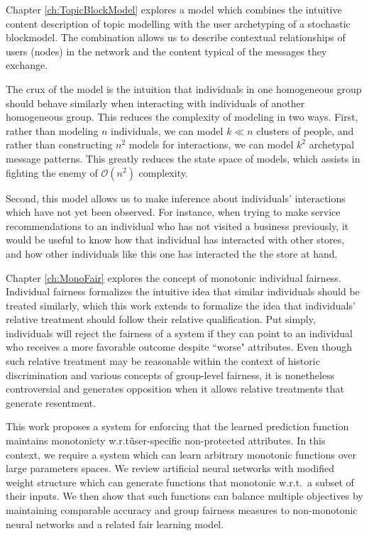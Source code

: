 Chapter \ref{ch:TopicBlockModel} explores a model which combines the intuitive content description of topic modelling with the user archetyping of a stochastic blockmodel.  The combination allows us to describe contextual relationships of users (nodes) in the network and the content typical of the messages they exchange.

The crux of the model is the intuition that individuals in one homogeneous group should behave similarly when interacting with individuals of another homogeneous group.  This reduces the complexity of modeling in two ways.  First, rather than modeling $n$ individuals, we can model $k \ll n$ clusters of people, and rather than constructing $n^2$ models for interactions, we can model $k^2$ archetypal message patterns.  This greatly reduces the state space of models, which assists in fighting the enemy of $\mathcal{O}(n^2)$ complexity.  

Second, this model allows us to make inference about individuals' interactions which have not yet been observed.  For instance, when trying to make service recommendations to an individual who has not visited a business previously, it would be useful to know how that individual has interacted with other stores, and how other individuals like this one has interacted the the store at hand.



Chapter \ref{ch:MonoFair} explores the concept of monotonic individual fairness.  Individual fairness \citep{dwork2012fairness} formalizes the intuitive idea that similar individuals should be treated similarly, which this work extends to formalize the idea that individuals' relative treatment should follow their relative qualification.  Put simply, individuals will reject the fairness of a system if they can point to an individual who receives a more favorable outcome despite ``worse" attributes.  Even though such relative treatment may be reasonable within the context of historic discrimination and various concepts of group-level fairness, it is nonetheless controversial and generates opposition when it allows relative treatments that generate resentment.

This work proposes a system for enforcing that the learned prediction function maintains monotonicty w.r.t\~ user-specific non-protected attributes.  In this context, we require a system which can learn arbitrary monotonic functions over large parameters spaces.  We review artificial neural networks with modified weight structure which can generate functions that monotonic w.r.t.\ a subset of their inputs. We then show that such functions can balance multiple objectives by maintaining comparable accuracy and group fairness measures to non-monotonic neural networks and a related fair learning model.



